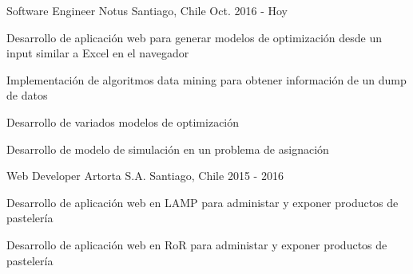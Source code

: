 

\begin{cventries}

  \cventry
    {Software Engineer} %
    {Notus} %
    {Santiago, Chile} %
    {Oct. 2016 - Hoy} %
    {
      \begin{cvitems} %
        \item {Desarrollo de aplicación web para generar modelos de optimización desde un input similar a Excel en el navegador}
        \item {Implementación de algoritmos data mining para obtener información de un dump de datos}
        \item {Desarrollo de variados modelos de optimización}
        \item {Desarrollo de modelo de simulación en un problema de asignación}
      \end{cvitems}
    }

  \cventry
    {Web Developer} %
    {Artorta S.A.} %
    {Santiago, Chile} %
    {2015 - 2016} %
    {
      \begin{cvitems} %
        \item {Desarrollo de aplicación web en LAMP para administar y exponer productos de pastelería}
        \item {Desarrollo de aplicación web en RoR para administar y exponer productos de pastelería}
      \end{cvitems}
    }

\end{cventries}
